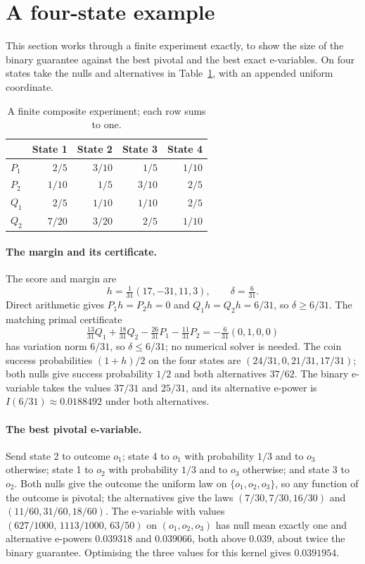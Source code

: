 \documentclass[11pt,a4paper]{article}
\theoremstyle{definition}
\theoremstyle{remark}
\begin{document}
\section{A four-state example}\label{sec:finite}

This section works through a finite experiment exactly, to show the size of the binary guarantee against the best pivotal and the best exact e-variables. On four states take the nulls and alternatives in Table~\ref{tab:example}, with an appended uniform coordinate.
\begin{table}[ht]
\centering
\begin{tabular}{lrrrr}\toprule
 & State 1 & State 2 & State 3 & State 4\\\midrule
\(P_1\) & \(2/5\) & \(3/10\) & \(1/5\) & \(1/10\)\\
\(P_2\) & \(1/10\) & \(1/5\) & \(3/10\) & \(2/5\)\\
\(Q_1\) & \(2/5\) & \(1/10\) & \(1/10\) & \(2/5\)\\
\(Q_2\) & \(7/20\) & \(3/20\) & \(2/5\) & \(1/10\)\\\bottomrule
\end{tabular}
\caption{A finite composite experiment; each row sums to one.}\label{tab:example}
\end{table}

\paragraph{The margin and its certificate.} The score and margin are
\[
 h=\tfrac1{31}(17,-31,11,3),\qquad\delta=\tfrac6{31}.
\]
Direct arithmetic gives \(P_1h=P_2h=0\) and \(Q_1h=Q_2h=6/31\), so \(\delta\ge6/31\). The matching primal certificate
\begin{equation}\label{eq:certificate}
 \tfrac{13}{31}Q_1+\tfrac{18}{31}Q_2-\tfrac{26}{31}P_1-\tfrac{11}{31}P_2=-\tfrac6{31}(0,1,0,0)
\end{equation}
has variation norm \(6/31\), so \(\delta\le6/31\); no numerical solver is needed. The coin success probabilities \((1+h)/2\) on the four states are \((24/31,0,21/31,17/31)\); both nulls give success probability \(1/2\) and both alternatives \(37/62\). The binary e-variable takes the values \(37/31\) and \(25/31\), and its alternative e-power is \(I(6/31)\approx0.0188492\) under both alternatives.

\paragraph{The best pivotal e-variable.} Send state 2 to outcome \(o_1\); state 4 to \(o_1\) with probability \(1/3\) and to \(o_3\) otherwise; state 1 to \(o_2\) with probability \(1/3\) and to \(o_3\) otherwise; and state 3 to \(o_2\). Both nulls give the outcome the uniform law on \(\{o_1,o_2,o_3\}\), so any function of the outcome is pivotal; the alternatives give the laws \((7/30,7/30,16/30)\) and \((11/60,31/60,18/60)\). The e-variable with values \((627/1000,\,1113/1000,\,63/50)\) on \((o_1,o_2,o_3)\) has null mean exactly one and alternative e-powers \(0.039318\) and \(0.039066\), both above \(0.039\), about twice the binary guarantee. Optimising the three values for this kernel gives \(0.0391954\).
\end{document}
